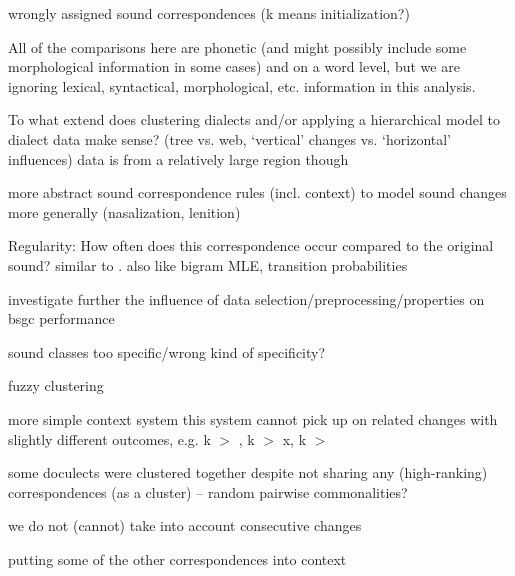 \documentclass[a4paper]{article}
\begin{document}
wrongly assigned sound correspondences (k means initialization?)


All of the comparisons here are phonetic (and might possibly include some morphological information in some cases) and on a word level, but we are ignoring lexical, syntactical, morphological, etc. information in this analysis.

To what extend does clustering dialects and/or applying a hierarchical model to dialect data make sense? (tree vs. web, `vertical' changes vs. `horizontal' influences)
data is from a relatively large region though

more abstract sound correspondence rules (incl. context) to model sound changes more generally (nasalization, lenition)

Regularity: How often does this correspondence occur compared to the original sound? similar to \citet{prokic2013combining}. also like bigram MLE, transition probabilities

investigate further the influence of data selection/preprocessing/properties on bsgc performance

sound classes too specific/wrong kind of specificity?

fuzzy clustering

more simple context system
this system cannot pick up on related changes with slightly different outcomes,
e.g. k $>$ , k $>$ x, k $>$ \textchi

some doculects were clustered together despite not sharing any (high-ranking) correspondences (as a cluster) -- random pairwise commonalities?

we do not (cannot) take into account consecutive changes

putting some of the other correspondences into context



\end{document}
